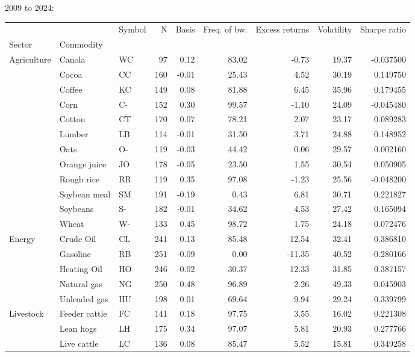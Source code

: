 \documentclass{article}
\begin{document}
\begin{adjustbox}{width=\textwidth}
2009 to 2024: \begin{tabular}{lllrrrrrr}
\toprule
 &  & Symbol & N & Basis & Freq. of bw. & Excess returns & Volatility & Sharpe ratio \\
Sector & Commodity &  &  &  &  &  &  &  \\
\midrule
\multirow[c]{12}{*}{Agriculture} & Canola & WC & 97 & 0.12 & 83.02 & -0.73 & 19.37 & -0.037500 \\
 & Cocoa & CC & 160 & -0.01 & 25.43 & 4.52 & 30.19 & 0.149750 \\
 & Coffee & KC & 149 & 0.08 & 81.88 & 6.45 & 35.96 & 0.179455 \\
 & Corn & C- & 152 & 0.30 & 99.57 & -1.10 & 24.09 & -0.045480 \\
 & Cotton & CT & 170 & 0.07 & 78.21 & 2.07 & 23.17 & 0.089283 \\
 & Lumber & LB & 114 & -0.01 & 31.50 & 3.71 & 24.88 & 0.148952 \\
 & Oats & O- & 119 & -0.03 & 44.42 & 0.06 & 29.57 & 0.002160 \\
 & Orange juice & JO & 178 & -0.05 & 23.50 & 1.55 & 30.54 & 0.050905 \\
 & Rough rice & RR & 119 & 0.35 & 97.08 & -1.23 & 25.56 & -0.048200 \\
 & Soybean meal & SM & 191 & -0.19 & 0.43 & 6.81 & 30.71 & 0.221827 \\
 & Soybeans & S- & 182 & -0.01 & 34.62 & 4.53 & 27.42 & 0.165094 \\
 & Wheat & W- & 133 & 0.45 & 98.72 & 1.75 & 24.18 & 0.072476 \\
\multirow[c]{5}{*}{Energy} & Crude Oil & CL & 241 & 0.13 & 85.48 & 12.54 & 32.41 & 0.386810 \\
 & Gasoline & RB & 251 & -0.09 & 0.00 & -11.35 & 40.52 & -0.280166 \\
 & Heating Oil & HO & 246 & -0.02 & 30.37 & 12.33 & 31.85 & 0.387157 \\
 & Natural gas & NG & 250 & 0.48 & 96.89 & 2.26 & 49.33 & 0.045903 \\
 & Unleaded gas & HU & 198 & 0.01 & 69.64 & 9.94 & 29.24 & 0.339799 \\
\multirow[c]{3}{*}{Livestock} & Feeder cattle & FC & 141 & 0.18 & 97.75 & 3.55 & 16.02 & 0.221308 \\
 & Lean hogs & LH & 175 & 0.34 & 97.07 & 5.81 & 20.93 & 0.277766 \\
 & Live cattle & LC & 136 & 0.08 & 85.47 & 5.52 & 15.81 & 0.349258 \\

\end{tabular}
\end{adjustbox}
\end{document}
